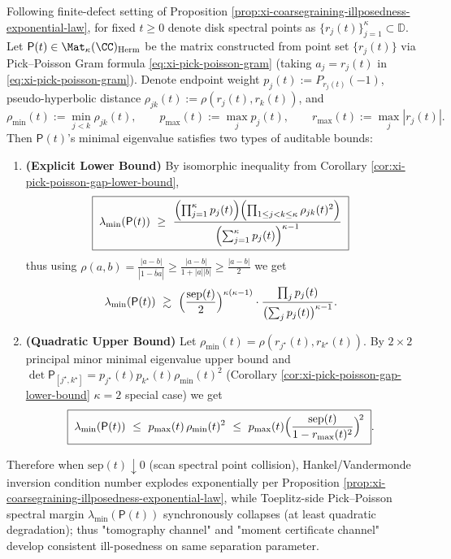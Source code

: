 \begin{proposition}\label{prop:xi-scan-toeplitz-conditioning-by-separation}
Following finite-defect setting of Proposition \ref{prop:xi-coarsegraining-illposedness-exponential-law}, for fixed \(t\ge 0\) denote disk spectral points as \(\{r_j(t)\}_{j=1}^{\kappa}\subset\mathbb{D}\).
Let \(\mathsf P(t)\in\Mat_{\kappa}(\CC)_{\mathrm{Herm}}\) be the matrix constructed from point set \(\{r_j(t)\}\) via Pick--Poisson Gram formula \eqref{eq:xi-pick-poisson-gram} (taking \(a_j=r_j(t)\) in \eqref{eq:xi-pick-poisson-gram}).
Denote endpoint weight \(p_j(t):=P_{r_j(t)}(-1)\), pseudo-hyperbolic distance \(\rho_{jk}(t):=\rho(r_j(t),r_k(t))\), and
\[
\rho_{\min}(t):=\min_{j<k}\rho_{jk}(t),\qquad
p_{\max}(t):=\max_j p_j(t),\qquad
r_{\max}(t):=\max_j|r_j(t)|.
\]
Then \(\mathsf P(t)\)'s minimal eigenvalue satisfies two types of auditable bounds:
\begin{enumerate}
  \item \textbf{(Explicit Lower Bound)} By isomorphic inequality from Corollary \ref{cor:xi-pick-poisson-gap-lower-bound},
  \[
  \boxed{\;
  \lambda_{\min}(\mathsf P(t))
  \ \ge\
  \frac{\Bigl(\prod_{j=1}^{\kappa}p_j(t)\Bigr)\Bigl(\prod_{1\le j<k\le\kappa}\rho_{jk}(t)^2\Bigr)}
  {\Bigl(\sum_{j=1}^{\kappa}p_j(t)\Bigr)^{\kappa-1}}\;}
  \]
  thus using \(\rho(a,b)=\frac{|a-b|}{|1-\overline b a|}\ge \frac{|a-b|}{1+|a||b|}\ge \frac{|a-b|}{2}\) we get
  \[
  \lambda_{\min}(\mathsf P(t))
  \ \gtrsim\
  \Bigl(\frac{\mathrm{sep}(t)}{2}\Bigr)^{\kappa(\kappa-1)}
  \cdot
  \frac{\prod_j p_j(t)}{\bigl(\sum_j p_j(t)\bigr)^{\kappa-1}}.
  \]
  \item \textbf{(Quadratic Upper Bound)} Let \(\rho_{\min}(t)=\rho(r_{j^\star}(t),r_{k^\star}(t))\).
  By \(2\times 2\) principal minor minimal eigenvalue upper bound and \(\det\mathsf P_{[j^\star,k^\star]}=p_{j^\star}(t)p_{k^\star}(t)\rho_{\min}(t)^2\) (Corollary \ref{cor:xi-pick-poisson-gap-lower-bound} \(\kappa=2\) special case) we get
  \[
  \boxed{\;
  \lambda_{\min}(\mathsf P(t))
  \ \le\
  p_{\max}(t)\,\rho_{\min}(t)^2
  \ \le\
  p_{\max}(t)\Bigl(\frac{\mathrm{sep}(t)}{1-r_{\max}(t)^2}\Bigr)^{\!2}\; }.
  \]
\end{enumerate}
Therefore when \(\mathrm{sep}(t)\downarrow 0\) (scan spectral point collision), Hankel/Vandermonde inversion condition number explodes exponentially per Proposition \ref{prop:xi-coarsegraining-illposedness-exponential-law}, while Toeplitz-side Pick--Poisson spectral margin \(\lambda_{\min}(\mathsf P(t))\) synchronously collapses (at least quadratic degradation); thus "tomography channel" and "moment certificate channel" develop consistent ill-posedness on same separation parameter.
\end{proposition}
